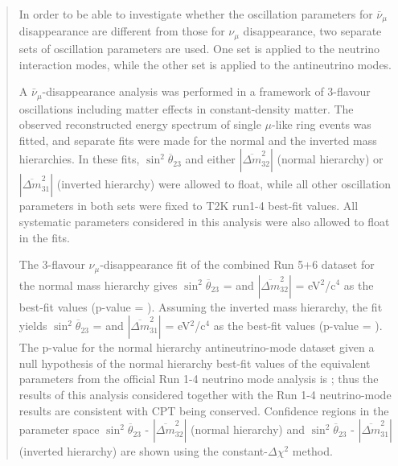 \begin{frontmatter}
\begin{abstract}
In order to be able to investigate whether the oscillation parameters for $\bar{\nu}_{\mu}$ disappearance are different
from those for $\nu_{\mu}$ disappearance, two separate sets of oscillation parameters are used.
One set is applied to the neutrino interaction modes,
while the other set is applied to the antineutrino modes.

A $\bar{\nu}_{\mu}$-disappearance analysis was performed 
in a framework of 3-flavour oscillations including matter effects in constant-density matter.
The observed reconstructed energy spectrum of single $\mu$-like ring events was fitted, 
and separate fits were made for the normal and the inverted mass hierarchies. In these fits, 
$\sin^{2}\overline{\theta}_{23}$ and 
either 
$|\overline{\Delta m}^{2}_{32}|$ 
(normal hierarchy) or $|\overline{\Delta m}^{2}_{31}|$ (inverted hierarchy) 
were allowed to float, while all other oscillation  parameters in both sets were fixed to T2K run1-4 best-fit values.
All \NSyst{} systematic parameters considered in this analysis were also allowed to float in the fits.

The 3-flavour $\nu_{\mu}$-disappearance fit of the combined Run 5+6 dataset for the normal mass hierarchy
gives $\sin^{2}\overline{\theta}_{23}$ = \BestFitMixingNormal{} and $|\overline{\Delta m}^{2}_{32}|$ = \BestFitDmsqNormal{} 
eV$^{2}$/c$^{4}$ as the best-fit values (p-value = \PValueNormal). Assuming the inverted mass hierarchy, the fit yields 
$\sin^{2}\overline{\theta}_{23}$ = \BestFitMixingInverted{} and $|\overline{\Delta m}^{2}_{31}|$ = \BestFitDmsqInverted{} 
eV$^{2}$/c$^{4}$ as the best-fit values (p-value = \PValueInverted). The p-value for the normal hierarchy antineutrino-mode dataset 
given a null hypothesis of the normal hierarchy best-fit values of the equivalent parameters from the official Run 1-4 neutrino 
mode analysis is \PValueNuModeComp; thus the results of this analysis considered together with the Run 1-4 neutrino-mode results are 
consistent with CPT being conserved. Confidence regions in the parameter space $\sin^{2}\overline{\theta}_{23}$ - $|\overline{\Delta m}^{2}_{32}|$ 
(normal hierarchy) and $\sin^{2}\overline{\theta}_{23}$ - $|\overline{\Delta m}^{2}_{31}|$ (inverted hierarchy) 
are shown using the constant-$\Delta\chi^2$ method.

\end{abstract}

\end{frontmatter}
